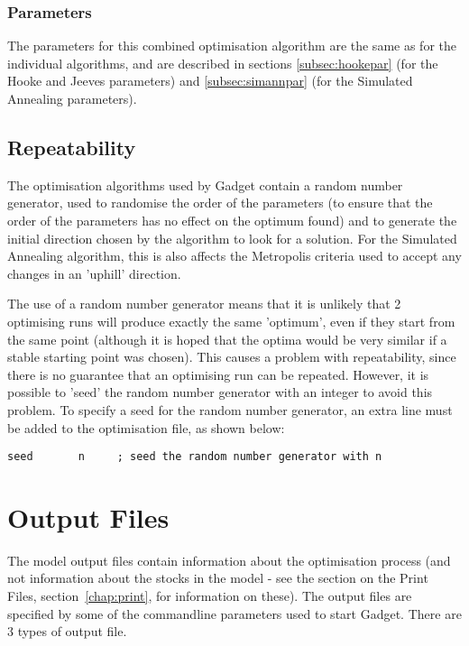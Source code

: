 \documentclass [a4paper, 10pt]{book}
\begin{document}
\subsection{Parameters}\label{subsec:simannandhookepar}
The parameters for this combined optimisation algorithm are the same as for the individual algorithms, and are described in sections \ref{subsec:hookepar} (for the Hooke and Jeeves parameters) and \ref{subsec:simannpar} (for the Simulated Annealing parameters).

\section{Repeatability}\label{sec:repeat}
The optimisation algorithms used by Gadget contain a random number generator, used to randomise the order of the parameters (to ensure that the order of the parameters has no effect on the optimum found) and to generate the initial direction chosen by the algorithm to look for a solution.  For the Simulated Annealing algorithm, this is also affects the Metropolis criteria used to accept any changes in an 'uphill' direction.

\bigskip
The use of a random number generator means that it is unlikely that 2 optimising runs will produce exactly the same 'optimum', even if they start from the same point (although it is hoped that the optima would be very similar if a stable starting point was chosen).  This causes a problem with repeatability, since there is no guarantee that an optimising run can be repeated.  However, it is possible to 'seed' the random number generator with an integer to avoid this problem.  To specify a seed for the random number generator, an extra line must be added to the optimisation file, as shown below:

{\small\begin{verbatim}
seed       n     ; seed the random number generator with n
\end{verbatim}}

\chapter{Output Files}\label{chap:output}
The model output files contain information about the optimisation process (and not information about the stocks in the model - see the section on the Print Files, section~\ref{chap:print}, for information on these).  The output files are specified by some of the commandline parameters used to start Gadget.  There are 3 types of output file.
\end{document}
